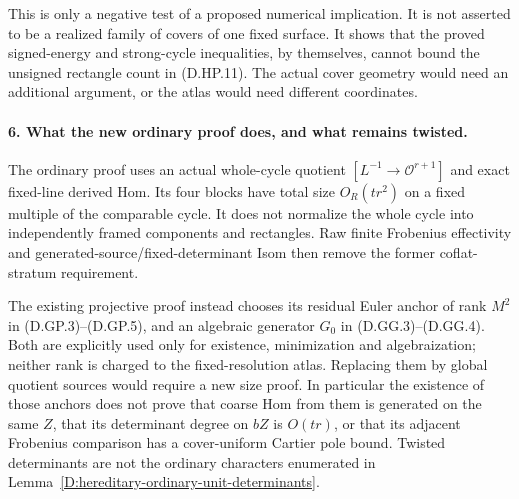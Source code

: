 This is only a negative test of a proposed numerical implication.
It is not asserted to be a realized family of covers of one fixed
surface. It shows that the proved signed-energy and strong-cycle
inequalities, by themselves, cannot bound the unsigned rectangle
count in (D.HP.11). The actual cover geometry would need an
additional argument, or the atlas would need different coordinates.

\paragraph{6. What the new ordinary proof does, and what remains twisted.}
The ordinary proof uses an actual whole-cycle quotient
$[L^{-1}\to\mathcal O^{r+1}]$ and exact fixed-line derived Hom.
Its four blocks have total size $O_R(tr^2)$ on a fixed multiple
of the comparable cycle. It does not normalize the whole cycle
into independently framed components and rectangles. Raw finite
Frobenius effectivity and generated-source/fixed-determinant Isom
then remove the former coflat-stratum requirement.

The existing projective proof instead chooses its residual
Euler anchor of rank $M^2$ in (D.GP.3)--(D.GP.5), and an
algebraic generator $G_0$ in (D.GG.3)--(D.GG.4). Both are
explicitly used only for existence, minimization and algebraization;
neither rank is charged to the fixed-resolution atlas. Replacing
them by global quotient sources would require a new size proof.
In particular the existence of those anchors does not prove
that coarse Hom from them is generated on the same $Z$, that
its determinant degree on $bZ$ is $O(tr)$, or that its adjacent
Frobenius comparison has a cover-uniform Cartier pole bound.
Twisted determinants are not the ordinary characters enumerated
in Lemma~\ref{D:hereditary-ordinary-unit-determinants}.

